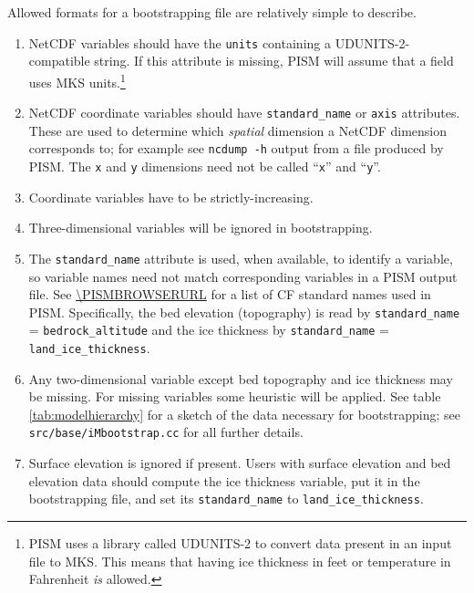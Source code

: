 Allowed formats for a bootstrapping file are relatively simple to describe. 
\begin{enumerate}
\item NetCDF variables should have the \texttt{units} containing a
  UDUNITS-2-compatible string. If this attribute is missing, PISM will assume
  that a field uses MKS units.\footnote{PISM uses a library called UDUNITS-2 to convert data present in an input file to MKS.   This means that having ice thickness in feet or temperature in Fahrenheit \emph{is} allowed.}
\item NetCDF coordinate variables should have \texttt{standard_name} or
  \texttt{axis} attributes. These are used to
  determine which \emph{spatial} dimension a NetCDF dimension corresponds to;
  for example see \texttt{ncdump -h} output from a file produced by PISM.  The
  \texttt{x} and \texttt{y} dimensions need not be called ``\texttt{x}''
  and ``\texttt{y}''.
\item Coordinate variables have to be strictly-increasing.
\item Three-dimensional variables will be ignored in bootstrapping.
\item The \texttt{standard_name} attribute is used, when available, to identify a variable, so
  variable names need not match corresponding variables in a
  PISM output file.  See \url{\PISMBROWSERURL} for a list of CF standard
  names used in PISM.  Specifically, the bed elevation (topography) is read by
  \texttt{standard_name} = \texttt{bedrock_altitude} and the ice thickness by
  \texttt{standard_name} = \texttt{land_ice_thickness}.
\item Any two-dimensional variable except bed topography and ice thickness may
  be missing. For missing variables some heuristic will be applied. See
  table \ref{tab:modelhierarchy} for a sketch of the data necessary for
  bootstrapping; see \texttt{src/base/iMbootstrap.cc} for all further details.
\item Surface elevation is ignored if present. Users with surface elevation and
  bed elevation data should compute the ice thickness variable, put it in the
  bootstrapping file, and set its \texttt{standard_name} to \texttt{land_ice_thickness}.
\end{enumerate}
